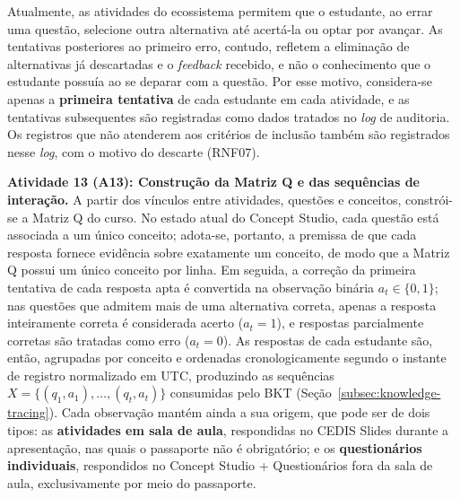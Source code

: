 Atualmente, as atividades do ecossistema permitem que o estudante, ao errar uma questão, selecione outra alternativa até acertá-la ou optar por avançar. As tentativas posteriores ao primeiro erro, contudo, refletem a eliminação de alternativas já descartadas e o \textit{feedback} recebido, e não o conhecimento que o estudante possuía ao se deparar com a questão. Por esse motivo, considera-se apenas a \textbf{primeira tentativa} de cada estudante em cada atividade, e as tentativas subsequentes são registradas como dados tratados no \textit{log} de auditoria. Os registros que não atenderem aos critérios de inclusão também são registrados nesse \textit{log}, com o motivo do descarte (RNF07).

\textbf{Atividade 13 (A13): Construção da Matriz Q e das sequências de interação.} A partir dos vínculos entre atividades, questões e conceitos, constrói-se a Matriz Q do curso. No estado atual do Concept Studio, cada questão está associada a um único conceito; adota-se, portanto, a premissa de que cada resposta fornece evidência sobre exatamente um conceito, de modo que a Matriz Q possui um único conceito por linha. Em seguida, a correção da primeira tentativa de cada resposta apta é convertida na observação binária $a_t \in \{0, 1\}$; nas questões que admitem mais de uma alternativa correta, apenas a resposta inteiramente correta é considerada acerto ($a_t = 1$), e respostas parcialmente corretas são tratadas como erro ($a_t = 0$). As respostas de cada estudante são, então, agrupadas por conceito e ordenadas cronologicamente segundo o instante de registro normalizado em UTC, produzindo as sequências $X = \{(q_1, a_1), \ldots, (q_t, a_t)\}$ consumidas pelo BKT (Seção~\ref{subsec:knowledge-tracing}). Cada observação mantém ainda a sua origem, que pode ser de dois tipos: as \textbf{atividades em sala de aula}, respondidas no CEDIS Slides durante a apresentação, nas quais o passaporte não é obrigatório; e os \textbf{questionários individuais}, respondidos no Concept Studio + Questionários fora da sala de aula, exclusivamente por meio do passaporte.

